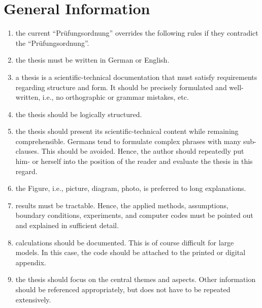 \section{General Information}
\begin{enumerate}
	\item the current \enquote{Prüfungsordnung} overrides the following rules if they contradict the \enquote{Prüfungsordnung}.
	\item the thesis must be written in German or English.	
	\item a thesis is a scientific-technical documentation that must satisfy requirements regarding structure and form. It should be precisely formulated and well-written, i.e., no orthographic or grammar mistakes, etc.
	\item the thesis should be logically structured.
	\item the thesis should present its scientific-technical content while remaining comprehensible. Germans tend to formulate complex phrases with many sub-clauses. This should be avoided. Hence, the author should repeatedly put him- or herself into the position of the reader and evaluate the thesis in this regard.
	\item the Figure, i.e., picture, diagram, photo, is preferred to long explanations.
	\item results must be tractable. Hence, the applied methods, assumptions, boundary conditions, experiments, and computer codes must be pointed out and explained in sufficient detail.
	\item calculations should be documented. This is of course difficult for large models. In this case, the code should be attached to the printed or digital appendix.
	\item the thesis should focus on the central themes and aspects. Other information should be referenced appropriately, but does not have to be repeated extensively.
\end{enumerate}
